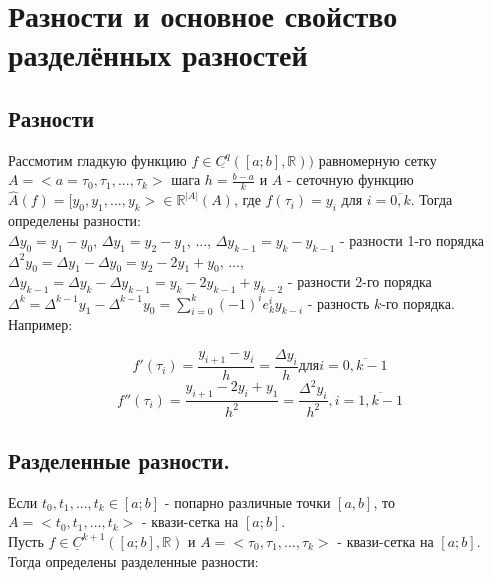 \documentclass[__main__.tex]{subfiles}
\begin{document}
\section{Разности и основное свойство разделённых разностей}

\subsection{Разности}

Рассмотим гладкую функцию $f \in \underline{C^q}([a;b],\mathbb{R}))$ равномерную сетку $A = <a = \tau_0, \tau_1, \text{...}, \tau_k>$ шага $h = \frac{b-a}{k}$ и $A$ - сеточную функцию $\hat{A}(f) = [y_0, y_1, \text{...}, y_k> \in \mathbb{R}^{|A|}(A)$, где $f(\tau_i) = y_i$ для $i = \overline{0, k}$. Тогда определены разности:\\

$\Delta y_0 = y_1 - y_0$, $\Delta y_1 = y_2 - y_1$, ..., $\Delta y_{k-1} = y_{k} - y_{k-1}$ - разности 1-го порядка\\

$\Delta^2 y_0 = \Delta y_1 - \Delta y_0 = y_2 - 2y_1 + y_0$, ..., $\Delta y_{k-1} = \Delta y_{k} - \Delta y_{k-1} = y_k - 2y_{k-1} + y_{k-2}$ - разности 2-го порядка\\

$\Delta^k = \Delta^{k-1} y_1 - \Delta^{k-1} y_0 = \sum_{i=0}^k (-1)^i e_k^i y_{k-i}$ - разность $k$-го порядка.\\

Например:

$$f'(\tau_i) = \frac{y_{i+1} - y_i}{h} = \frac{\Delta y_i}{h} \text{для} i = \overline{0, k-1}$$
$$f''(\tau_i) = \frac{y_{i+1} - 2y_i + y_1}{h^2} = \frac{\Delta^2 y_i}{h^2}, i = \overline{1, k - 1}$$

\subsection{Разделенные разности.}

Если $t_0, t_1, \text{...}, t_k \in [a; b]$ - попарно различные точки $[a, b]$, то $A = <t_0, t_1, \text{...}, t_k>$ - квази-сетка на $[a; b]$.\\

Пусть $f \in \underline{C}^{k+1}([a; b], \mathbb{R})$ и $A = <\tau_0, \tau_1, \text{...}, \tau_k>$ - квази-сетка на $[a; b]$. Тогда определены разделенные разности:
\end{document}
